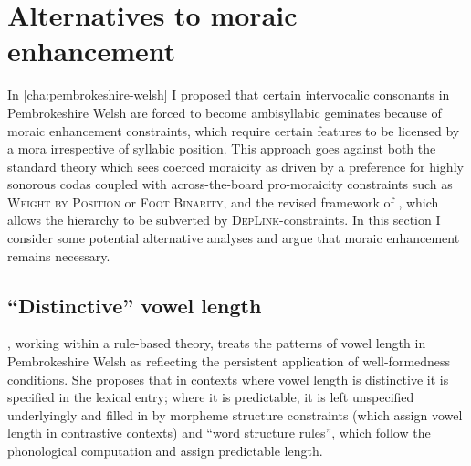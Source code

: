 \section{Alternatives to moraic enhancement}
\label{sec:alternative-analyses}

In \cref{cha:pembrokeshire-welsh} I proposed that certain intervocalic consonants in Pembrokeshire Welsh are forced to become ambisyllabic geminates because of moraic enhancement constraints, which require certain features to be licensed by a mora irrespective of syllabic position. This approach goes against both the standard theory \citep{zec88:_sonor,delacy2006} which sees coerced moraicity as driven by a preference for highly sonorous codas coupled with across\hyp the\hyp board pro-moraicity constraints such as \textsc{Weight by Position} or \textsc{Foot Binarity}, and the revised framework of \citet{moren01:_distin}, which allows the hierarchy to be subverted by \textsc{DepLink}-\mo constraints. In this section I consider some potential alternative analyses and argue that moraic enhancement remains necessary.

\subsection{\enquote{Distinctive} vowel length}
\label{sec:enqu-vowel-length}


\citet{awbery86:_pembr_welsh}, working within a rule-based theory, treats the patterns of vowel length in Pembrokeshire Welsh as reflecting the persistent application of well-formedness conditions. She proposes that in contexts where vowel length is distinctive it is specified in the lexical entry; where it is predictable, it is left unspecified underlyingly and filled in by morpheme structure constraints (which assign vowel length in contrastive contexts) and \enquote{word structure rules}, which follow the phonological computation and assign predictable length.

